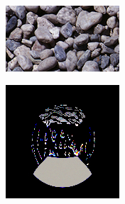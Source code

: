 \begin{figure}[]
\begin{subfigure}{\textwidth}
        \begin{subfigure}{0.19\textwidth}
            \centering
            \includegraphics[width=\textwidth]{images/04-experiment03/ball_pebble_target.jpg}
            \caption*{}
        \end{subfigure}
        \hfill
        \begin{subfigure}{0.19\textwidth}
            \centering
            \includegraphics[width=\textwidth]{images/04-experiment03/ball_dof/pebbles/stats_im.jpg}
            \caption*{}
        \end{subfigure}
        \hfill
        \begin{subfigure}{0.19\textwidth}

\end{subfigure}
\end{subfigure}
\end{figure}
